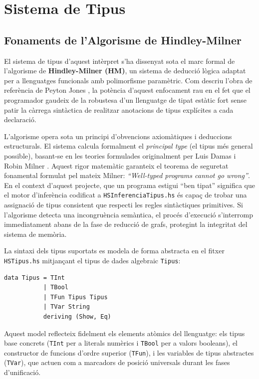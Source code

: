 \chapter{Sistema de Tipus}

\section{Fonaments de l'Algorisme de Hindley-Milner}

El sistema de tipus d'aquest intèrpret s'ha dissenyat sota el marc formal de l'algorisme de \textbf{Hindley-Milner (HM)}, un sistema de deducció lògica adaptat per a llenguatges funcionals amb polimorfisme paramètric. Com descriu l'obra de referència de Peyton Jones \cite{peyton1987implementation}, la potència d'aquest enfocament rau en el fet que el programador gaudeix de la robustesa d'un llenguatge de tipat estàtic fort sense patir la càrrega sintàctica de realitzar anotacions de tipus explícites a cada declaració.

L'algorisme opera sota un principi d'obvencions axiomàtiques i deduccions estructurals. El sistema calcula formalment el \textit{principal type} (el tipus més general possible), basant-se en les teories formulades originalment per Luis Damas i Robin Milner \cite{damas1982principal}. Aquest rigor matemàtic garanteix el teorema de seguretat fonamental formulat pel mateix Milner: \textit{``Well-typed programs cannot go wrong''}. En el context d'aquest projecte, que un programa estigui ``ben tipat'' significa que el motor d'inferència codificat a \texttt{HSInferenciaTipus.hs} és capaç de trobar una assignació de tipus consistent que respecti les regles sintàctiques primitives. Si l'algorisme detecta una incongruència semàntica, el procés d'execució s'interromp immediatament abans de la fase de reducció de grafs, protegint la integritat del sistema de memòria.

La sintaxi dels tipus suportats es modela de forma abstracta en el fitxer \texttt{HSTipus.hs} mitjançant el tipus de dades algebraic \texttt{Tipus}:

\begin{lstlisting}[style=haskellstyle, caption=Definició formal dels tipus de dades de l'intèrpret]
data Tipus = TInt
           | TBool
           | TFun Tipus Tipus
           | TVar String
           deriving (Show, Eq)
\end{lstlisting}

Aquest model reflecteix fidelment els elements atòmics del llenguatge: els tipus base concrets (\texttt{TInt} per a literals numèrics i \texttt{TBool} per a valors booleans), el constructor de funcions d'ordre superior (\texttt{TFun}), i les variables de tipus abstractes (\texttt{TVar}), que actuen com a marcadors de posició universals durant les fases d'unificació.

